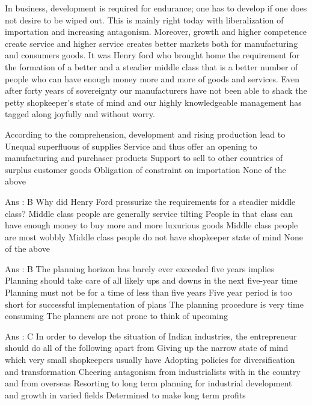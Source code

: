In business, development is required for endurance; one has to develop if one does not desire to be wiped out. This is mainly right today with liberalization of importation and increasing antagonism. Moreover, growth and higher competence create service and higher service creates better markets both for manufacturing and consumers goods. It was Henry ford who brought home the requirement for the formation of a better and a steadier middle class that is a better number of people who can have enough money more and more of goods and services. Even after forty years of sovereignty our manufacturers have not been able to shack the petty shopkeeper’s state of mind and our highly knowledgeable management has tagged along joyfully and without worry.

    According to the comprehension, development and rising production lead to
        Unequal superfluous of supplies
        Service and thus offer an opening to manufacturing and purchaser products
        Support to sell to other countries of surplus customer goods
        Obligation of constraint on importation
        None of the above 

    Ans : B
    Why did Henry Ford pressurize the requirements for a steadier middle class?
        Middle class people are generally service tilting
        People in that class can have enough money to buy more and more luxurious goods
        Middle class people are most wobbly
        Middle class people do not have shopkeeper state of mind
        None of the above 

    Ans : B
    The planning horizon has barely ever exceeded five years implies
        Planning should take care of all likely ups and downs in the next five-year time
        Planning must not be for a time of less than five years
        Five year period is too short for successful implementation of plans
        The planning procedure is very time consuming
        The planners are not prone to think of upcoming 

    Ans : C
    In order to develop the situation of Indian industries, the entrepreneur should do all of the following apart from
        Giving up the narrow state of mind which very small shopkeepers usually have
        Adopting policies for diversification and transformation
        Cheering antagonism from industrialists with in the country and from overseas
        Resorting to long term planning for industrial development and growth in varied fields
        Determined to make long term profits 

